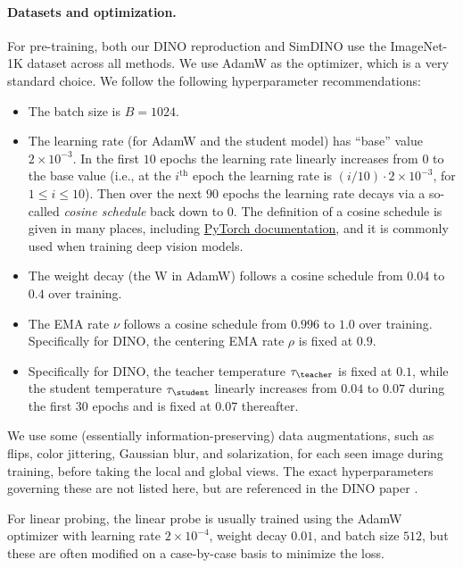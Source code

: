 \documentclass[../../book-main.tex]{subfiles}
\begin{document}
\paragraph{Datasets and optimization.} For pre-training, both our DINO reproduction and SimDINO use the ImageNet-1K dataset across all methods. We use AdamW \citep{Loshchilov2017DecoupledWD} as the optimizer, which is a very standard choice. We follow the following hyperparameter recommendations:
\begin{itemize}
    \item The batch size is \(B = 1024\).
    \item The learning rate (for AdamW and the student model) has ``base'' value \(2 \times 10^{-3}\). In the first \(10\) epochs the learning rate linearly increases from \(0\) to the base value (i.e., at the \(i^{\mathrm{th}}\) epoch the learning rate is \((i/10) \cdot 2 \times 10^{-3}\), for \(1 \leq i \leq 10\)). Then over the next \(90\) epochs the learning rate decays via a so-called \textit{cosine schedule} back down to \(0\). The definition of a cosine schedule is given in many places, including \href{https://pytorch.org/docs/stable/generated/torch.optim.lr_scheduler.CosineAnnealingLR.html}{PyTorch documentation}, and it is commonly used when training deep vision models.
    \item The weight decay (the W in AdamW) follows a cosine schedule from 0.04 to \(0.4\) over training.
    \item The EMA rate \(\nu\) follows a cosine schedule from \(0.996\) to \(1.0\) over training. Specifically for DINO, the centering EMA rate \(\rho\) is fixed at \(0.9\).
    \item Specifically for DINO, the teacher temperature \(\tau_{\teacher}\) is fixed at \(0.1\), while the student temperature \(\tau_{\student}\) linearly increases from \(0.04\) to \(0.07\) during the first \(30\) epochs and is fixed at \(0.07\) thereafter.
\end{itemize}
We use some (essentially information-preserving) data augmentations, such as flips, color jittering, Gaussian blur, and solarization, for each seen image during training, before taking the local and global views. The exact hyperparameters governing these are not listed here, but are referenced in the DINO paper \citep{caron2021emerging}.

For linear probing, the linear probe is usually trained using the AdamW optimizer with learning rate \(2 \times 10^{-4}\), weight decay \(0.01\), and batch size \(512\), but these are often modified on a case-by-case basis to minimize the loss.
\end{document}
